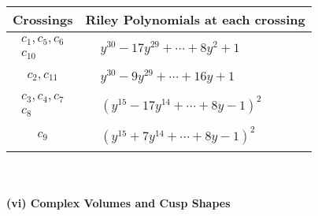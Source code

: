 \documentclass[1p]{elsarticle_modified}
\theoremstyle{definition}
\begin{document}
\begin{tabular}{m{50pt}|m{274pt}}
Crossings & \hspace{64pt}Riley Polynomials at each crossing \\
\hline $$\begin{aligned}c_{1},c_{5},c_{6}\\c_{10}\end{aligned}$$&$\begin{aligned}
&y^{30}-17 y^{29}+\cdots+8 y^2+1
\end{aligned}$\\
\hline $$\begin{aligned}c_{2},c_{11}\end{aligned}$$&$\begin{aligned}
&y^{30}-9 y^{29}+\cdots+16 y+1
\end{aligned}$\\
\hline $$\begin{aligned}c_{3},c_{4},c_{7}\\c_{8}\end{aligned}$$&$\begin{aligned}
&(y^{15}-17 y^{14}+\cdots+8 y-1)^{2}
\end{aligned}$\\
\hline $$\begin{aligned}c_{9}\end{aligned}$$&$\begin{aligned}
&(y^{15}+7 y^{14}+\cdots+8 y-1)^{2}
\end{aligned}$\\
\hline
\end{tabular}\\~\\
\newpage\flushleft \textbf{(vi) Complex Volumes and Cusp Shapes}
\end{document}
